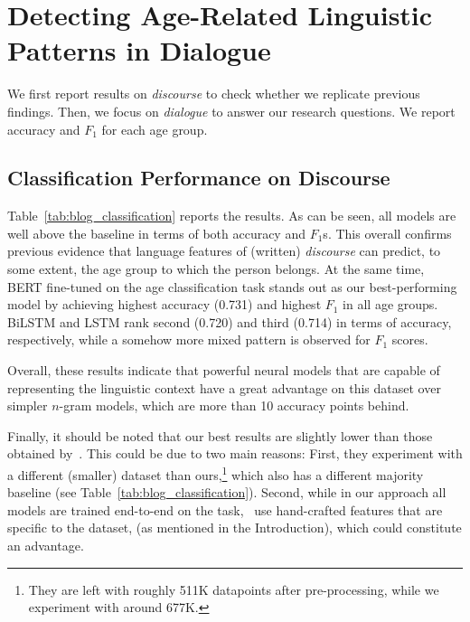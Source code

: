 \section{Detecting Age-Related Linguistic Patterns in Dialogue}
\label{sec:exp1_results}

We first report results on \emph{discourse}
to check whether we replicate
previous findings. Then, we focus on \emph{dialogue} to answer our research questions. We report accuracy and $F_1$ for each age group.

\subsection{Classification Performance on Discourse}
Table~\ref{tab:blog_classification} reports the results.
As can be seen,
all models are well above the baseline in terms of both accuracy and 
$F_1$s. This overall confirms previous evidence \cite{schler2006effects} that language features of (written) \emph{discourse} can predict, to some extent, the age group to which the person
belongs. At the same time, BERT fine-tuned on the age classification task stands out as our best-performing model by achieving highest accuracy (0.731) and highest $F_1$ in all age groups.
BiLSTM and LSTM rank second (0.720) and third (0.714) in terms of accuracy, respectively, while a somehow more mixed pattern is observed for $F_1$ scores.

Overall, these results indicate that powerful neural models that are capable of representing the linguistic context %
have a great advantage on this dataset over simpler $n$-gram models, which are more than 10 accuracy points behind. 

Finally, it should be noted that our best results are slightly lower than those obtained by~\citet{schler2006effects}. This could be due to two main reasons: First, they experiment with a
different (smaller)
dataset than ours,\footnote{They are left with roughly 511K datapoints after pre-processing, 
while we experiment with around 677K.}
which also 
has 
a different majority baseline (see Table~\ref{tab:blog_classification}). Second, while in our approach all models are trained end-to-end on the task,~\citet{schler2006effects} use
hand-crafted features that are specific to the dataset, (as mentioned in the Introduction), 
which could constitute an advantage.


